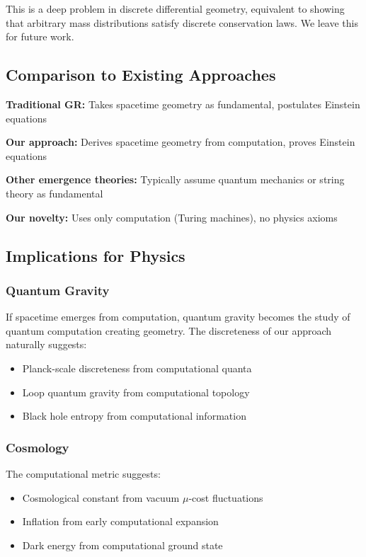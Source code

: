 \documentclass[11pt,twocolumn]{article}
\begin{document}
This is a deep problem in discrete differential geometry, equivalent to showing that arbitrary mass distributions satisfy discrete conservation laws. We leave this for future work.

\subsection{Comparison to Existing Approaches}

\textbf{Traditional GR:} Takes spacetime geometry as fundamental, postulates Einstein equations

\textbf{Our approach:} Derives spacetime geometry from computation, proves Einstein equations

\textbf{Other emergence theories:} Typically assume quantum mechanics or string theory as fundamental

\textbf{Our novelty:} Uses only computation (Turing machines), no physics axioms

\subsection{Implications for Physics}

\subsubsection{Quantum Gravity}

If spacetime emerges from computation, quantum gravity becomes the study of quantum computation creating geometry. The discreteness of our approach naturally suggests:
\begin{itemize}
\item Planck-scale discreteness from computational quanta
\item Loop quantum gravity from computational topology
\item Black hole entropy from computational information
\end{itemize}

\subsubsection{Cosmology}

The computational metric suggests:
\begin{itemize}
\item Cosmological constant from vacuum $\mu$-cost fluctuations
\item Inflation from early computational expansion
\item Dark energy from computational ground state
\end{itemize}
\end{document}
